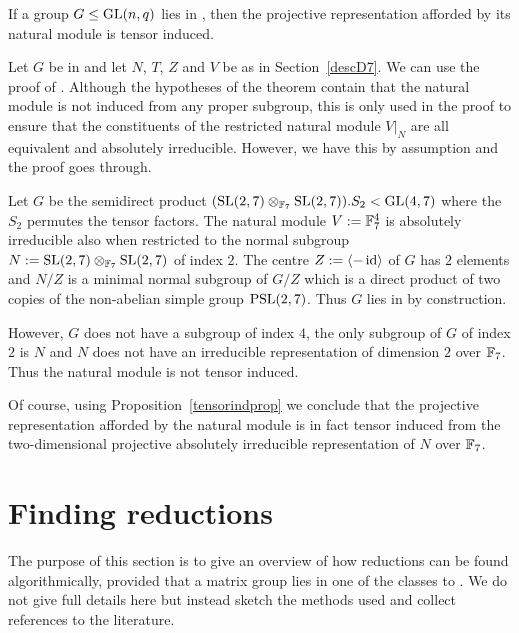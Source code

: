 \begin{Prop}
    \label{tensorindprop}
If a group $G \le \GL(n,q)$ lies in , then the projective
representation afforded by its natural module is tensor induced.
\end{Prop}
\proofbeg
Let $G$ be in  and let $N$, $T$, $Z$ and $V$ be as in
Section~\ref{descD7}.
We can use the proof of \cite[Tensor Induction Theorem]{kovacs}. 
Although the hypotheses of
the theorem contain that the natural module is not induced from any
proper subgroup, this is only used in the proof to ensure that the
constituents of the restricted natural module $V|_N$ are all
equivalent and absolutely irreducible. However, we have this by
assumption and the proof goes through.
\proofend

\begin{Rem}
    \label{nottensorind}
    Let $G$ be the semidirect product 
    $(\SL(2,7) \otimes_{\F_7} \SL(2,7)).S_2 < \GL(4,7)$ where the
    $S_2$ permutes the tensor factors. The natural module $V := \mathbb{F}_7^4$ is
    absolutely irreducible also when restricted to the normal subgroup
    $N := \SL(2,7) \otimes_{\F_7} \SL(2,7)$ of index $2$. The centre 
    $Z := \left< -\id \right>$ of $G$ has $2$ elements and $N/Z$ is a
    minimal normal subgroup of $G/Z$ which is a direct product of two
    copies of the non-abelian simple group $\PSL(2,7)$. Thus $G$ lies
    in  by construction.

    However, $G$ does not have a subgroup of index $4$, the only 
    subgroup of $G$ of index $2$ is $N$ and $N$ does
    not have an irreducible representation of dimension $2$ over
    $\mathbb{F}_7$. Thus the natural module is not tensor induced.

    Of course, using Proposition~\ref{tensorindprop} we conclude that
    the projective representation afforded by the natural module is in
    fact tensor induced from the two-dimensional projective
    absolutely irreducible representation of $N$ over $\mathbb{F}_7$.
\end{Rem}

\section{Finding reductions}
\label{findred}
%

The purpose of this section is to give an overview of how reductions can
be found algorithmically, provided that a matrix group
lies in one of the classes  to . We do not give full details
here but instead sketch the methods used and collect references to the
literature.

